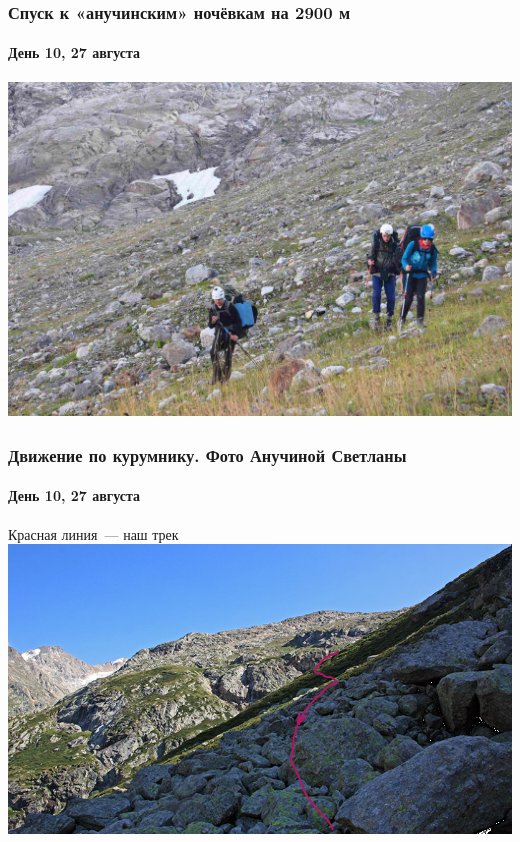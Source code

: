 \begin{frame}
	\frametitle{Спуск к «анучинским» ночёвкам на 2900 м}
	\framesubtitle{День 10, 27 августа}
	\centering
	\includegraphics[width=\textwidth]{../pics/DSC_0430 2}			
\end{frame}

\begin{frame}
	\frametitle{Движение по курумнику. Фото Анучиной Светланы}
	\framesubtitle{День 10, 27 августа}
	\footnotesize Красная линия~--- наш трек
	\centering
	\includegraphics[width=\textwidth]{../pics/peremkurum.png}			
\end{frame}

